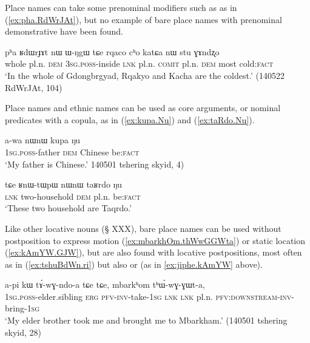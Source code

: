 Place names can take some prenominal modifiers such as  as in (\ref{ex:pha.RdWrJAt}), but no example of bare place names with prenominal demonstrative have been found. %

\begin{exe}
\ex \label{ex:pha.RdWrJAt}
 \gll pʰa ʁdɯrɟɤt nɯ ɯ-ŋgɯ tɕe rqaco cʰo katɕa nɯ stu ɣɤndʐo \\
 whole pl.n. \textsc{dem} \textsc{3sg}.\textsc{poss}-inside \textsc{lnk} pl.n. \textsc{comit} pl.n. \textsc{dem} most cold:\textsc{fact} \\
 \glt  `In the whole of Gdongbrgyad, Rqakyo and Kacha are the coldest.' (140522 RdWrJAt, 104)
\end{exe}

Place names and ethnic names can be used as core arguments, or nominal predicates with a copula, as in (\ref{ex:kupa.Nu}) and (\ref{ex:taRdo.Nu}).

\begin{exe}
\ex \label{ex:kupa.Nu}
\gll  a-wa nɯnɯ kupa ŋu \\
\textsc{1sg}.\textsc{poss}-father \textsc{dem} Chinese be:\textsc{fact}  \\
\glt `My father is Chinese.' 140501 tshering skyid, 4)
\end{exe}

\begin{exe}
\ex \label{ex:taRdo.Nu}
\gll  tɕe ʁnɯ-tɯpɯ nɯnɯ taʁrdo ŋu  \\
\textsc{lnk} two-household \textsc{dem} pl.n. be:\textsc{fact} \\
\glt `These two household are Taqrdo.' 
\end{exe}

Like other locative nouns (§ XXX), bare place names can be used without postposition to express motion (\ref{ex:mbarkhOm.thWwGGWta}) or static location (\ref{ex:kAmYW.GJW}), but are also found with locative postpositions, most often  as in (\ref{ex:tshuBdWn.ri}) but also  or  (as in \ref{ex:jiphe.kAmYW} above).

\begin{exe}
\ex \label{ex:mbarkhOm.thWwGGWta}
 \gll a-pi kɯ tɤ́-wɣ-ndo-a tɕe tɕe, mbarkʰom tʰɯ́-wɣ-ɣɯt-a, \\
 \textsc{1sg}.\textsc{poss}-elder.sibling  \textsc{erg} \textsc{pfv}-\textsc{inv}-take-\textsc{1sg} \textsc{lnk} \textsc{lnk} pl.n.   \textsc{pfv:downstream}-\textsc{inv}-bring-\textsc{1sg}  \\
\glt `My elder brother took me and brought me to Mbarkham.' (140501 tshering skyid, 28)
\end{exe}

